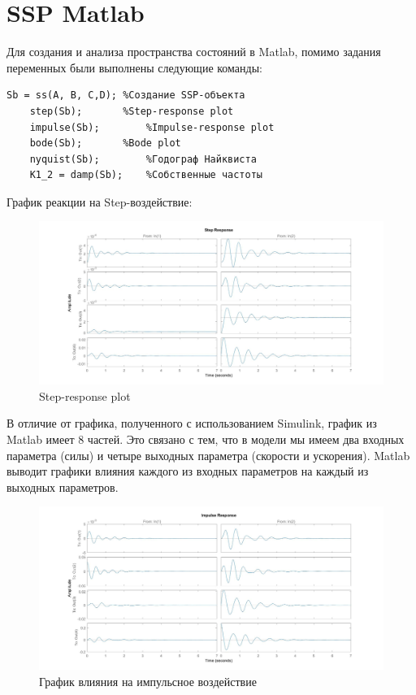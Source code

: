 \documentclass{article}
\begin{document}
	\section*{SSP Matlab}
	Для создания и анализа пространства состояний в Matlab, помимо задания переменных были выполнены следующие команды:
	\lstset{frameround=fttt}
	\begin{lstlisting}[firstnumber=1, frame=trBL, firstnumber=1,label=some-code,caption=Создание и анализ SSP в Matlab]
	Sb = ss(A, B, C,D);	%Создание SSP-объекта
	step(Sb);		%Step-response plot
	impulse(Sb);		%Impulse-response plot
	bode(Sb);		%Bode plot
	nyquist(Sb);		%Годограф Найквиста
	K1_2 = damp(Sb);	%Собственные частоты
	\end{lstlisting}

	График реакции на Step-воздействие:
	\begin{figure}[H]
		\centering
		\includegraphics[width=1.2\linewidth]{mstep}
		\caption{Step-response plot}
		\label{fig:mstep}
	\end{figure}
	В отличие от графика, полученного с использованием Simulink, график из Matlab имеет 8 частей. Это связано с тем, что в модели мы имеем два входных параметра (силы) и четыре выходных параметра (скорости и ускорения). Matlab выводит графики влияния каждого из входных параметров на каждый из выходных параметров.
	\begin{figure}[H]
		\centering
		\includegraphics[width=1.2\linewidth]{mimp}
		\caption{График влияния на импульсное воздействие}
		\label{fig:mimp}
	\end{figure}
\end{document}
